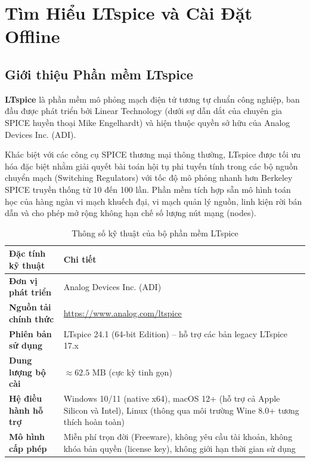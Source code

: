 \documentclass[12pt,a4paper]{report}
\begin{document}
\chapter{Tìm Hiểu LTspice và Cài Đặt Offline}

\section{Giới thiệu Phần mềm LTspice}
\textbf{LTspice} là phần mềm mô phỏng mạch điện tử tương tự chuẩn công nghiệp, ban đầu được phát triển bởi Linear Technology (dưới sự dẫn dắt của chuyên gia SPICE huyền thoại Mike Engelhardt) và hiện thuộc quyền sở hữu của Analog Devices Inc. (ADI). 

Khác biệt với các công cụ SPICE thương mại thông thường, LTspice được tối ưu hóa đặc biệt nhằm giải quyết bài toán hội tụ phi tuyến tính trong các bộ nguồn chuyển mạch (Switching Regulators) với tốc độ mô phỏng nhanh hơn Berkeley SPICE truyền thống từ 10 đến 100 lần. Phần mềm tích hợp sẵn mô hình toán học của hàng ngàn vi mạch khuếch đại, vi mạch quản lý nguồn, linh kiện rời bán dẫn và cho phép mở rộng không hạn chế số lượng nút mạng (nodes).

\begin{table}[H]
\centering
\caption{Thông số kỹ thuật của bộ phần mềm LTspice}
\label{tab:ltspice_specs}
\renewcommand{\arraystretch}{1.2}
\begin{tabularx}{\textwidth}{|l|X|}
\hline
\rowcolor{codebg}
\textbf{Đặc tính kỹ thuật} & \textbf{Chi tiết} \\ \hline
\textbf{Đơn vị phát triển} & Analog Devices Inc. (ADI) \\ \hline
\textbf{Nguồn tải chính thức} & \url{https://www.analog.com/ltspice} \\ \hline
\textbf{Phiên bản sử dụng} & LTspice 24.1 (64-bit Edition) -- hỗ trợ các bản legacy LTspice 17.x \\ \hline
\textbf{Dung lượng bộ cài} & $\approx 62.5\text{ MB}$ (cực kỳ tinh gọn) \\ \hline
\textbf{Hệ điều hành hỗ trợ} & Windows 10/11 (native x64), macOS 12+ (hỗ trợ cả Apple Silicon và Intel), Linux (thông qua môi trường Wine 8.0+ tương thích hoàn toàn) \\ \hline
\textbf{Mô hình cấp phép} & Miễn phí trọn đời (Freeware), không yêu cầu tài khoản, không khóa bản quyền (license key), không giới hạn thời gian sử dụng \\ \hline
\end{tabularx}
\end{table}
\end{document}
